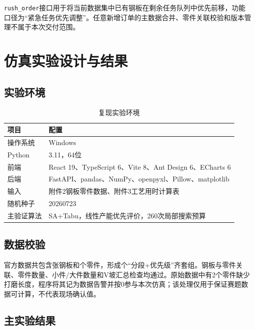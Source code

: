 \documentclass[UTF8,zihao=-4,openany]{ctexrep}
\newcommand{\code}[1]{\texttt{#1}}
\begin{document}
\code{rush\_order}接口用于将当前数据集中已有钢板在剩余任务队列中优先前移，功能口径为“紧急任务优先调整”。任意新增订单的主数据合并、零件关联校验和版本管理不属于本次交付范围。

\chapter{仿真实验设计与结果}

\section{实验环境}

\begin{table}[H]
\centering
\caption{复现实验环境}
\begin{tabularx}{\textwidth}{p{}Y}
\toprule
项目 & 配置 \\
\midrule
操作系统 & Windows \\
Python & 3.11，64位 \\
前端 & React 19、TypeScript 6、Vite 8、Ant Design 6、ECharts 6 \\
后端 & FastAPI、pandas、NumPy、openpyxl、Pillow、matplotlib \\
输入 & 附件2钢板零件数据、附件3工艺用时计算表 \\
随机种子 & 20260723 \\
主验证算法 & SA+Tabu，线性产能优先评价，260次局部搜索预算 \\
\bottomrule
\end{tabularx}
\end{table}

\section{数据校验}

官方数据共包含\PlateCount 张钢板和\PartCount 个零件，形成\KitGroupCount 个“分段+优先级”齐套组。钢板与零件关联、零件数量、小件/大件数量和V坡汇总检查均通过。原始数据中有2个零件缺少打磨长度，程序将其记为数据告警并按0参与本次仿真；该处理仅用于保证赛题数据可计算，不代表现场确认值。

\section{主实验结果}
\end{document}
